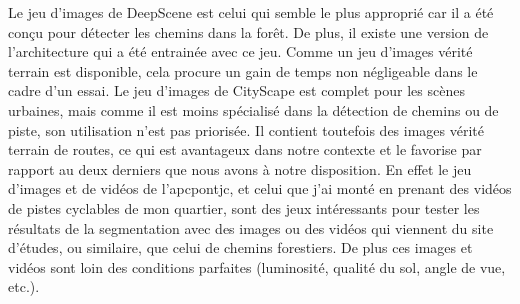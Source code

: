 ﻿\noindent Le jeu d'images de DeepScene est celui qui semble le plus approprié car il a été conçu pour détecter les chemins dans la forêt. De plus, il existe une version de l'architecture qui a été entrainée avec ce jeu. Comme un jeu d'images vérité terrain est disponible, cela procure un gain de temps non négligeable dans le cadre d'un essai. Le jeu d'images de CityScape est complet pour les scènes urbaines, mais comme il est moins spécialisé dans la détection de chemins ou de piste, son utilisation n'est pas priorisée. Il contient toutefois des images vérité terrain de routes, ce qui est avantageux dans notre contexte et le favorise par rapport au deux derniers que nous avons à notre disposition. En effet le jeu d'images et de vidéos de l'\acrshort{apcpontjc}, et celui que j'ai monté en prenant des vidéos de pistes cyclables de mon quartier, sont des jeux intéressants pour tester les résultats de la segmentation avec des images ou des vidéos qui viennent du site d'études, ou similaire, que celui de chemins forestiers. De plus ces images et vidéos sont loin des conditions parfaites (luminosité, qualité du sol, angle de vue, etc.).
